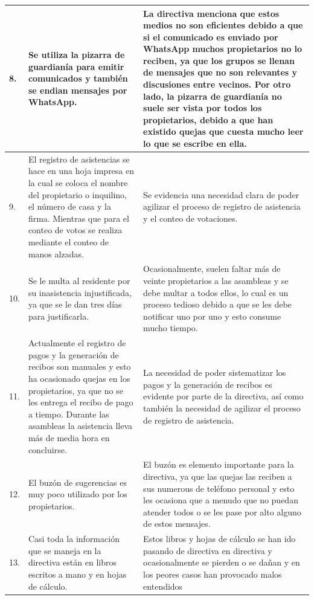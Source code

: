 \begin{center}
\begin{small}
\begin{longtable}[c]{|p{} |p{} |p{}|}
        \hline
        8. & Se utiliza la pizarra de guardianía para emitir comunicados y también se endian mensajes por WhatsApp.
        & La directiva menciona que estos medios no son eficientes debido a que si el comunicado es enviado por WhatsApp muchos propietarios no lo reciben, ya que los grupos se llenan de mensajes que no son relevantes y discusiones entre vecinos.
        Por otro lado, la pizarra de guardianía no suele ser vista por todos los propietarios, debido a que han existido quejas que cuesta mucho leer lo que se escribe en ella.\\
        \hline
        9. & El registro de asistencias se hace en una hoja impresa en la cual se coloca el nombre del propietario o inquilino, el número de casa y la firma.
        Mientras que para el conteo de votos se realiza mediante el conteo de manos alzadas.
        & Se evidencia una necesidad clara de poder agilizar el proceso de registro de asistencia y el conteo de votaciones.\\
        \hline
        10.
        & Se le multa al residente por su inasistencia injustificada, ya que se le dan tres días para justificarla.
        & Ocasionalmente, suelen faltar más de veinte propietarios a las asambleas y se debe multar a todos ellos, lo cual es un proceso tedioso debido a que se les debe notificar uno por uno y esto consume mucho tiempo.\\
        \hline
        11.
        & Actualmente el registro de pagos y la generación de recibos son manuales y esto ha ocasionado quejas en los propietarios, ya que no se les entrega el recibo de pago a tiempo.
        Durante las asambleas la asistencia lleva más de media hora en concluirse.
        & La necesidad de poder sistematizar los pagos y la generación de recibos es evidente por parte de la directiva, así como también la necesidad de agilizar el proceso de registro de asistencia.\\
        \hline
        12.
        & El buzón de sugerencias es muy poco utilizado por los propietarios.
        & El buzón es elemento importante para la directiva, ya que las quejas las reciben a sus numerous de teléfono personal y esto les ocasiona que a menudo que no puedan atender todos o se les pase por alto alguno de estos mensajes.\\
        \hline
        13.
        & Casi toda la información que se maneja en la directiva están en libros escritos a mano y en hojas de cálculo.
        & Estos libros y hojas de cálculo se han ido pasando de directiva en directiva y ocasionalmente se pierden o se dañan y en los peores casos han provocado malos entendidos\\
        \hline
    \end{longtable}
    \end{small}
\end{center}

